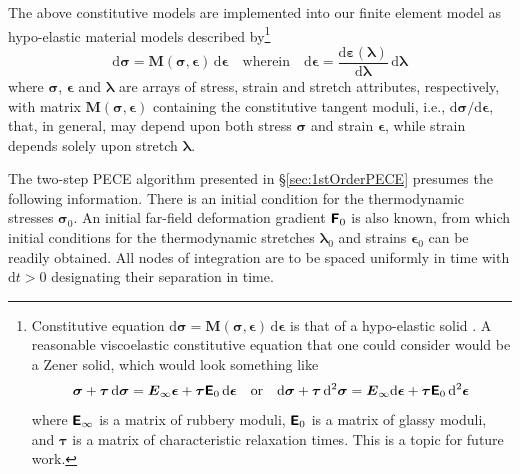 The above constitutive models are implemented into our finite element model as hypo-elastic material models \cite{Truesdell55} described by\footnote{
    Constitutive equation $\mathrm{d} \boldsymbol{\sigma} = \mathbf{M} ( \boldsymbol{\sigma}, \boldsymbol{\epsilon} ) \, \mathrm{d} \boldsymbol{\epsilon}$ is that of a hypo-elastic solid \cite{Truesdell55}.  A reasonable visco\-elastic constitutive equation that one could consider would be a Zener \cite{Zener48} solid, which would look something like
    $$ \boldsymbol{\sigma} + \boldsymbol{\tau} \, \mathrm{d} \boldsymbol{\sigma} = \boldsymbol{E}_{\infty} \boldsymbol{\epsilon} + \boldsymbol{\tau} \boldsymbol{\mathsf{E}}_0 \, \mathrm{d} \boldsymbol{\epsilon} 
    \quad \text{or} \quad 
    \mathrm{d} \boldsymbol{\sigma} + \boldsymbol{\tau} \, \mathrm{d}^2 \boldsymbol{\sigma} = \boldsymbol{E}_{\infty} \mathrm{d} \boldsymbol{\epsilon} + \boldsymbol{\tau} \boldsymbol{\mathsf{E}}_0 \, \mathrm{d}^2 \boldsymbol{\epsilon}$$ 
    where $\boldsymbol{\mathsf{E}}_{\infty}$ is a matrix of rubbery moduli, $\boldsymbol{\mathsf{E}}_0$ is a matrix of glassy moduli, and $\boldsymbol{\tau}$ is a matrix of characteristic relaxation times.  This is a topic for future work.
}
\begin{equation}
\mathrm{d} \boldsymbol{\sigma} = \mathbf{M} ( \boldsymbol{\sigma}, \boldsymbol{\epsilon} ) \, \mathrm{d} \boldsymbol{\epsilon} 
\quad \text{wherein} \quad
\mathrm{d} \boldsymbol{\epsilon} = 
\frac{\mathrm{d} \boldsymbol{\varepsilon} ( \boldsymbol{\lambda} )}
{\mathrm{d} \boldsymbol{\lambda}} \, \mathrm{d} \boldsymbol{\lambda}
\label{hypoelastic}
\end{equation}
where $\boldsymbol{\sigma}$, $\boldsymbol{\epsilon}$ and $\boldsymbol{\lambda}$ are arrays of stress, strain and stretch attributes, respectively, with matrix $\mathbf{M} ( \boldsymbol{\sigma}, \boldsymbol{\epsilon} )$ containing the constitutive tangent moduli, i.e., $\mathrm{d} \boldsymbol{\sigma} / \mathrm{d} \boldsymbol{\epsilon}$, that, in general, may depend upon both stress $\boldsymbol{\sigma}$ and strain $\boldsymbol{\epsilon}$, while strain depends solely upon stretch $\boldsymbol{\lambda}$.

The two-step PECE algorithm presented in \S\ref{sec:1stOrderPECE} presumes the following information.  There is an initial condition for the thermo\-dynamic stresses $\boldsymbol{\sigma}_0$.  An initial far-field deformation gradient $\boldsymbol{\mathsf{F}}_0$ is also known, from which initial conditions for the thermo\-dynamic stretches $\boldsymbol{\lambda}_0$ and strains $\boldsymbol{\epsilon}_0$ can be readily obtained.  All nodes of integration are to be spaced uniformly in time with $\mathrm{d}t > 0$ designating their separation in time.  

